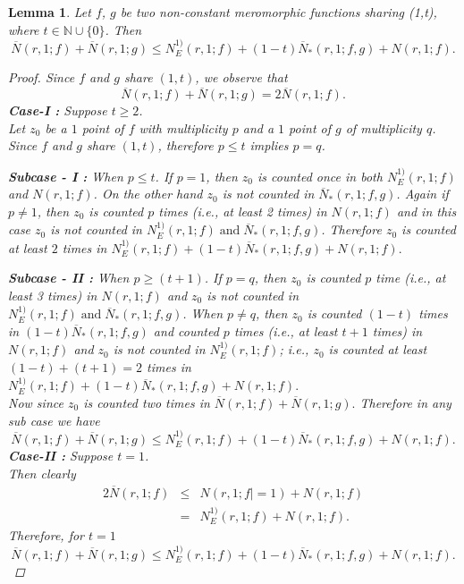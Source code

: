 \documentclass[a4paper,draft]{amsproc}
\theoremstyle{plain}
\newtheorem{lem}{Lemma}[section]
\theoremstyle{definition}
\theoremstyle{remark}
\newcommand{\ol}{\overline}
\newcommand{\bea}{\begin{eqnarray}}
\newcommand{\eea}{\end{eqnarray}}
\numberwithin{equation}{section}
\renewcommand{\leq}{\leqslant}\renewcommand{\geq}{\geqslant}
\begin{document}
\begin{lem}\label{new}
Let $f$, $g$ be two non-constant meromorphic functions sharing (1,t), where $t\in\mathbb{N}\cup\{0\}$. Then
$$\ol N(r,1;f)+\ol N(r,1;g)\leq N_{E}^{1)}(r,1;f)+\left(1-t\right) \ol N_{*}(r,1;f,g)+N(r,1;f).$$

\begin{proof}
Since $f$ and $g$ share $(1,t)$, we observe that $$\ol N(r,1;f)+\ol N(r,1;g)=2\ol N(r,1;f).$$
{\bf Case-I :} Suppose $t\geq 2$.\\
Let $z_0$ be a $1$ point of $f$ with multiplicity $p$ and a $1$ point of $g$ of multiplicity $q$. Since $f$ and $g$ share $(1,t)$, therefore $p\leq t$ implies $p=q$.
\par{\bf Subcase - I :} When $p\leq t$.
If $p=1$, then $z_0$ is counted once in both $N_{E}^{1)}(r,1;f)$ and $N(r,1;f)$. On the other hand $z_0$ is not counted in $\ol N_{*}(r,1;f,g)$. Again if $p\ne 1$, then $z_0$ is counted $p$ times (i.e., at least 2 times) in $N(r,1;f)$ and in this case $z_0$ is not counted in $N_{E}^{1)}(r,1;f) \;\text{and}\; \ol N_{*}(r,1;f,g)$. Therefore $z_0$ is counted at least $2$ times in $N_{E}^{1)}(r,1;f)+\left(1-t\right) \ol N_{*}(r,1;f,g)+N(r,1;f).$
\par{\bf Subcase - II :} When $p\geq (t+1)$. If $p=q$, then $z_0$ is counted $p$ time (i.e., at least 3 times) in  $N(r,1;f)$ and $z_0$ is not counted in $N_{E}^{1)}(r,1;f) \;\text{and}\; \ol N_{*}(r,1;f,g)$. When $p\ne q$, then $z_0$ is counted $(1-t)$ times in $(1-t)\ol N_{*}(r,1;f,g)$ and counted $p$ times (i.e., at least $t+1$ times) in  $N(r,1;f)$ and $z_0$ is not counted in $ N_{E}^{1)}(r,1;f)$; i.e., $z_0$ is counted at least $(1-t)+(t+1)=2$ times in $N_{E}^{1)}(r,1;f)+\left(1-t\right) \ol N_{*}(r,1;f,g)+N(r,1;f).$\\
Now since $z_0$ is counted two times in $\ol N(r,1;f)+\ol N(r,1;g).$ Therefore in any sub case we have 
$$\ol N(r,1;f)+\ol N(r,1;g)\leq N_{E}^{1)}(r,1;f)+\left(1-t\right) \ol N_{*}(r,1;f,g)+N(r,1;f) .$$
{\bf Case-II :} Suppose $t=1$.\\
Then clearly \bea 2\ol N(r,1;f)\nonumber &\leq& N(r,1;f|=1) +N(r,1
;f)\\\nonumber&=&  N_{E}^{1)}(r,1;f)+N(r,1;f).\nonumber \eea
Therefore, for $t=1$
$$\ol N(r,1;f)+\ol N(r,1;g)\leq N_{E}^{1)}(r,1;f)+\left(1-t\right) \ol N_{*}(r,1;f,g)+N(r,1;f).$$


\end{proof}
\end{lem}
\end{document}
